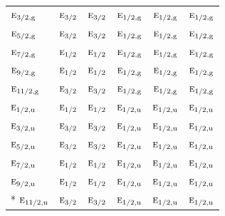 \documentclass[10pt,a4paper]{article}
\numberwithin{equation}{section}
\newcommand{\irr}[1]{\text{\normalfont\scshape #1}}
\newcommand{\ptag}[1]{\mathrm{#1}}
\begin{document}
{\begin{longtable}{@{}lccccc@{}}
$\irr{e}_{3/2,\ptag{g}}$ & $\irr{e}_{3/2}$ & $\irr{e}_{3/2}$ & $\irr{e}_{1/2,\ptag{g}}$ & $\irr{e}_{1/2,\ptag{g}}$ & $\irr{e}_{1/2,\ptag{g}}$\\
$\irr{e}_{5/2,\ptag{g}}$ & $\irr{e}_{3/2}$ & $\irr{e}_{3/2}$ & $\irr{e}_{1/2,\ptag{g}}$ & $\irr{e}_{1/2,\ptag{g}}$ & $\irr{e}_{1/2,\ptag{g}}$\\
$\irr{e}_{7/2,\ptag{g}}$ & $\irr{e}_{1/2}$ & $\irr{e}_{1/2}$ & $\irr{e}_{1/2,\ptag{g}}$ & $\irr{e}_{1/2,\ptag{g}}$ & $\irr{e}_{1/2,\ptag{g}}$\\
$\irr{e}_{9/2,\ptag{g}}$ & $\irr{e}_{1/2}$ & $\irr{e}_{1/2}$ & $\irr{e}_{1/2,\ptag{g}}$ & $\irr{e}_{1/2,\ptag{g}}$ & $\irr{e}_{1/2,\ptag{g}}$\\
$\irr{e}_{11/2,\ptag{g}}$ & $\irr{e}_{3/2}$ & $\irr{e}_{3/2}$ & $\irr{e}_{1/2,\ptag{g}}$ & $\irr{e}_{1/2,\ptag{g}}$ & $\irr{e}_{1/2,\ptag{g}}$\\
$\irr{e}_{1/2,\ptag{u}}$ & $\irr{e}_{1/2}$ & $\irr{e}_{1/2}$ & $\irr{e}_{1/2,\ptag{u}}$ & $\irr{e}_{1/2,\ptag{u}}$ & $\irr{e}_{1/2,\ptag{u}}$\\
$\irr{e}_{3/2,\ptag{u}}$ & $\irr{e}_{3/2}$ & $\irr{e}_{3/2}$ & $\irr{e}_{1/2,\ptag{u}}$ & $\irr{e}_{1/2,\ptag{u}}$ & $\irr{e}_{1/2,\ptag{u}}$\\
$\irr{e}_{5/2,\ptag{u}}$ & $\irr{e}_{3/2}$ & $\irr{e}_{3/2}$ & $\irr{e}_{1/2,\ptag{u}}$ & $\irr{e}_{1/2,\ptag{u}}$ & $\irr{e}_{1/2,\ptag{u}}$\\
$\irr{e}_{7/2,\ptag{u}}$ & $\irr{e}_{1/2}$ & $\irr{e}_{1/2}$ & $\irr{e}_{1/2,\ptag{u}}$ & $\irr{e}_{1/2,\ptag{u}}$ & $\irr{e}_{1/2,\ptag{u}}$\\
$\irr{e}_{9/2,\ptag{u}}$ & $\irr{e}_{1/2}$ & $\irr{e}_{1/2}$ & $\irr{e}_{1/2,\ptag{u}}$ & $\irr{e}_{1/2,\ptag{u}}$ & $\irr{e}_{1/2,\ptag{u}}$\\*
$\irr{e}_{11/2,\ptag{u}}$ & $\irr{e}_{3/2}$ & $\irr{e}_{3/2}$ & $\irr{e}_{1/2,\ptag{u}}$ & $\irr{e}_{1/2,\ptag{u}}$ & $\irr{e}_{1/2,\ptag{u}}$\\
\bottomrule\end{longtable}}
\end{document}

